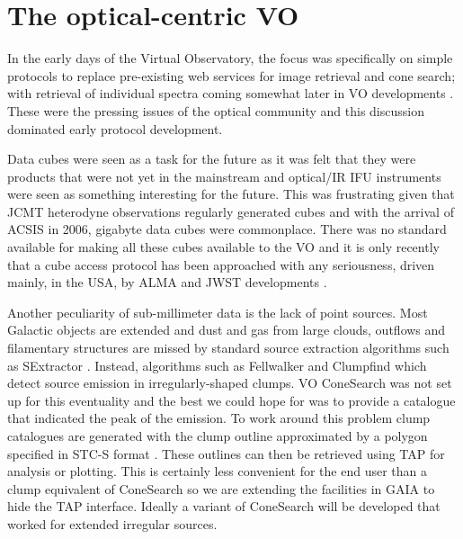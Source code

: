 \documentclass[final,authoryear,5p,times,twocolumn]{elsarticle}
\begin{document}
\section{The optical-centric VO}

In the early days of the Virtual Observatory, the focus was
specifically on simple protocols \citep{siap,cone} to replace pre-existing
web services for image retrieval and cone search; with retrieval of
individual spectra coming somewhat later in VO developments
\citep{ssap,splatvo}. These were the pressing issues of the optical
community and this discussion dominated early protocol development.

Data cubes were seen as a task for the future as it was
felt that they were products that were not yet in the mainstream and
optical/IR IFU instruments \citep[such as
UIST;][]{2004SPIE.5492.1160R} were seen as something interesting for
the future. This was frustrating given that JCMT heterodyne
observations regularly generated cubes and with the arrival of ACSIS
in 2006, gigabyte data cubes were commonplace. There was no standard
available for making all these cubes available to the VO and it is
only recently \citep[e.g.,][]{2014AAS...22325505T} that a cube access
protocol has been approached with any seriousness, driven mainly, in
the USA, by ALMA and JWST developments \citep[e.g.,
MIRI;][]{2010SPIE.7731E..10W}.

Another peculiarity of sub-millimeter data is the lack of point
sources. Most Galactic objects are extended and dust and gas from
large clouds, outflows and filamentary structures are missed by
standard source extraction algorithms such as SExtractor
\citep[][]{1996A&AS..117..393B}. Instead, algorithms
such as Fellwalker \citep[][]{2007ASPC..376..425B} and
Clumpfind \citep[][]{1994ApJ...428..693W} which detect
source emission in irregularly-shaped clumps. VO ConeSearch was not
set up for this eventuality and the best we could hope for was to
provide a catalogue that indicated the peak of the emission. To work
around this problem clump catalogues are generated with the clump
outline approximated by a polygon specified in STC-S format
\citep{2010ASPC..434..213B}. These outlines can then be retrieved
using TAP for analysis or plotting. This is certainly less convenient
for the end user than a clump equivalent of ConeSearch so we are
extending the facilities in GAIA
\citep[][]{2009ASPC..411..575D} to hide the TAP
interface. Ideally a variant of ConeSearch will be developed that
worked for extended irregular sources.
\end{document}
